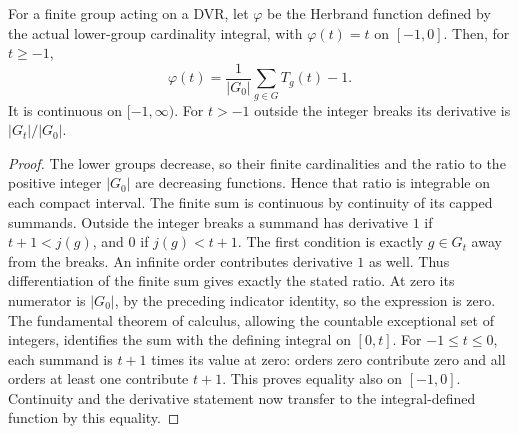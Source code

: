 \begin{lemma}
\label{fw:herbrand-finite-sum}
\leanok
For a finite group acting on a DVR, let $\varphi$ be the Herbrand function
defined by the actual lower-group cardinality integral, with
$\varphi(t)=t$ on $[-1,0]$. Then, for $t\geq-1$,
\[
 \varphi(t)=\frac{1}{|G_0|}\sum_{g\in G}T_g(t)-1.
\]
It is continuous on $[-1,\infty)$. For $t>-1$ outside the integer breaks
its derivative is $|G_t|/|G_0|$.
\end{lemma}
\begin{proof}
The lower groups decrease, so their finite cardinalities and the ratio
to the positive integer $|G_0|$ are decreasing functions. Hence that
ratio is integrable on each compact interval. The finite sum is continuous
by continuity of its capped summands. Outside the integer breaks a summand
has derivative $1$ if $t+1<j(g)$, and $0$ if $j(g)<t+1$.
The first condition is exactly $g\in G_t$ away from the breaks. An infinite
order contributes derivative $1$ as well. Thus differentiation of the
finite sum gives exactly the stated ratio. At zero its numerator is
$|G_0|$, by the preceding indicator identity, so the expression is zero.
The fundamental theorem of calculus, allowing the countable exceptional
set of integers, identifies the sum with the defining integral on $[0,t]$.
For $-1\leq t\leq0$, each summand is $t+1$ times its value at zero:
orders zero contribute zero and all orders at least one contribute $t+1$.
This proves equality also on $[-1,0]$. Continuity and the derivative
statement now transfer to the integral-defined function by this equality.
\end{proof}

